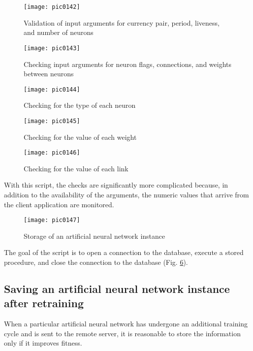 \begin{figure}[h]
\centering
\texttt{[image: pic0142]}
\caption{Validation of input arguments for currency pair, period, liveness, and number of neurons}
\label{fig:pic0142}
\end{figure}
\FloatBarrier

\begin{figure}[h]
\centering
\texttt{[image: pic0143]}
\caption{Checking input arguments for neuron flags, connections, and weights between neurons}
\label{fig:pic0143}
\end{figure}
\FloatBarrier

\begin{figure}[h]
\centering
\texttt{[image: pic0144]}
\caption{Checking for the type of each neuron}
\label{fig:pic0144}
\end{figure}
\FloatBarrier

\begin{figure}[h]
\centering
\texttt{[image: pic0145]}
\caption{Checking for the value of each weight}
\label{fig:pic0145}
\end{figure}
\FloatBarrier

\begin{figure}[h]
\centering
\texttt{[image: pic0146]}
\caption{Checking for the value of each link}
\label{fig:pic0146}
\end{figure}
\FloatBarrier

With this script, the checks are significantly more complicated because, in addition to the availability of the arguments, the numeric values that arrive from the client application are monitored.

\begin{figure}[h]
\centering
\texttt{[image: pic0147]}
\caption{Storage of an artificial neural network instance}
\label{fig:pic0147}
\end{figure}
\FloatBarrier

The goal of the script is to open a connection to the database, execute a stored procedure, and close the connection to the database (Fig. \ref{fig:pic0147}).

\subsection{Saving an artificial neural network instance after retraining}

When a particular artificial neural network has undergone an additional training cycle and is sent to the remote server, it is reasonable to store the information only if it improves fitness.


